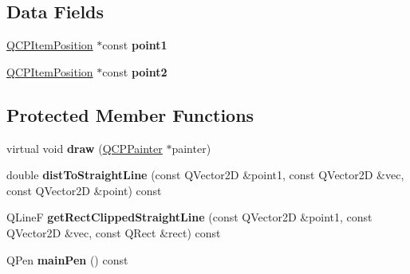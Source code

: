 \subsection*{Data Fields}
\begin{DoxyCompactItemize}
\item 
\hypertarget{classQCPItemStraightLine_ac131a6ffe456f2cc7364dce541fe0120}{\hyperlink{classQCPItemPosition}{Q\-C\-P\-Item\-Position} $\ast$const {\bfseries point1}}\label{classQCPItemStraightLine_ac131a6ffe456f2cc7364dce541fe0120}

\item 
\hypertarget{classQCPItemStraightLine_ad26c0a732e471f63f75d481dcd48cfc9}{\hyperlink{classQCPItemPosition}{Q\-C\-P\-Item\-Position} $\ast$const {\bfseries point2}}\label{classQCPItemStraightLine_ad26c0a732e471f63f75d481dcd48cfc9}

\end{DoxyCompactItemize}
\subsection*{Protected Member Functions}
\begin{DoxyCompactItemize}
\item 
\hypertarget{classQCPItemStraightLine_a2daa1e1253216c26565d56a2d5530170}{virtual void {\bfseries draw} (\hyperlink{classQCPPainter}{Q\-C\-P\-Painter} $\ast$painter)}\label{classQCPItemStraightLine_a2daa1e1253216c26565d56a2d5530170}

\item 
\hypertarget{classQCPItemStraightLine_adc9b6c5bd33c7f806b748b79dfa25926}{double {\bfseries dist\-To\-Straight\-Line} (const Q\-Vector2\-D \&point1, const Q\-Vector2\-D \&vec, const Q\-Vector2\-D \&point) const }\label{classQCPItemStraightLine_adc9b6c5bd33c7f806b748b79dfa25926}

\item 
\hypertarget{classQCPItemStraightLine_af18ac29577b5b96fece15b0ffea70177}{Q\-Line\-F {\bfseries get\-Rect\-Clipped\-Straight\-Line} (const Q\-Vector2\-D \&point1, const Q\-Vector2\-D \&vec, const Q\-Rect \&rect) const }\label{classQCPItemStraightLine_af18ac29577b5b96fece15b0ffea70177}

\item 
\hypertarget{classQCPItemStraightLine_a63ef39814c5b560dbb7b13e3fec1d940}{Q\-Pen {\bfseries main\-Pen} () const }\label{classQCPItemStraightLine_a63ef39814c5b560dbb7b13e3fec1d940}

\end{DoxyCompactItemize}
